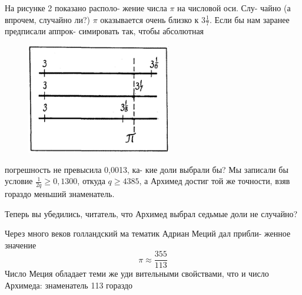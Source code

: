 \documentclass[11pt]{article}
\begin{document}
\begin{multicols}{2}
    На рисунке 2 показано располо- жение числа $\pi$ на числовой оси. Слу- чайно (а впрочем, случайно ли?) $\pi$ оказывается очень близко к 3$\frac{1}{7}$. Если бы нам заранее предписали аппрок- симировать так, чтобы абсолютная \\
    \begin{figure}[H]
        \includegraphics[width=\linewidth]{image2}
        \label{fig:image2} %
        \caption{}
    \end{figure}
    погрешность не превысила 0,0013, ка- кие доли выбрали бы? Мы записали бы условие $\frac{1}{2q}\geq 0,1300$, откуда $q\geq 4385$,
    а Архимед достиг той же точности, взяв гораздо меньший знаменатель.
    
    Теперь вы убедились, читатель, что Архимед выбрал седьмые доли не случайно?
    
    Через много веков голландский ма тематик Адриан Меций дал прибли- женное значение
    \[\pi \approx \frac{355}{113}\]
    Число Меция обладает теми же уди вительными свойствами, что и число Архимеда: знаменатель 113 гораздо 
\end{multicols}
\end{document}
